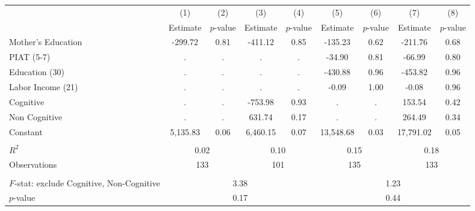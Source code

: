 \begin{tabular}{lcccccccc} \toprule
 & (1) & (2) & (3) & (4) & (5) & (6) & (7) & (8) \\
 & Estimate & $p$-value & Estimate & $p$-value  & Estimate & $p$-value  & Estimate & $p$-value  \\ \midrule 
Mother's Education &      -299.72 &         0.81 &      -411.12 &         0.85 &      -135.23 &         0.62 &      -211.76 &         0.68 \\  
PIAT (5-7) &            . &            . &            . &            . &       -34.90 &         0.81 &       -66.99 &         0.80 \\  
Education (30) &            . &            . &            . &            . &      -430.88 &         0.96 &      -453.82 &         0.96 \\  
Labor Income (21) &            . &            . &            . &            . &        -0.09 &         1.00 &        -0.08 &         0.96 \\  
Cognitive &            . &            . &      -753.98 &         0.93 &            . &            . &       153.54 &         0.42 \\  
Non Cognitive &            . &            . &       631.74 &         0.17 &            . &            . &       264.49 &         0.34 \\  
Constant &     5,135.83 &         0.06 &     6,460.15 &         0.07 &    13,548.68 &         0.03 &    17,791.02 &         0.05 \\   \\ \midrule
$R^2$ &         \multicolumn{2}{c}{0.02} &         \multicolumn{2}{c}{0.10} &               \multicolumn{2}{c}{0.15} &            \multicolumn{2}{c}{0.18}  \\  
Observations &       \multicolumn{2}{c}{133} &           \multicolumn{2}{c}{101} &         \multicolumn{2}{c}{135} &            \multicolumn{2}{c}{133}  \\  \\ \midrule
$F$-stat: exclude Cognitive, Non-Cognitive &              \multicolumn{4}{c}{3.38} &             \multicolumn{4}{c}{1.23}  \\  
$p$-value &            \multicolumn{4}{c}{0.17} &               \multicolumn{4}{c}{0.44}  \\   \bottomrule \end{tabular}


